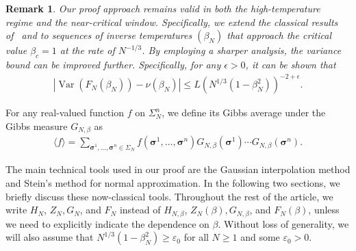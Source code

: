 \documentclass[letterpaper,11pt,reqno]{amsart}
\newtheorem{remark}{Remark}
\renewcommand{\ge}{\geqslant}
\renewcommand{\leq}{\leqslant}
\newcommand{\ra}{\rangle}
\newcommand{\la}{\langle}
\newcommand{\eps}{\varepsilon}
\newcommand{\abs}[1]{\left\vert#1\right\vert}
\newcommand{\mvgs}{\boldsymbol{\sigma}}\newcommand{\mvgS}{\boldsymbol{\Sigma}}\newcommand{\mvgt}{\boldsymbol{\tau}}
\DeclareMathOperator{\var}{Var}
\begin{document}
\begin{remark}
    Our proof approach remains valid in both the high-temperature regime and the near-critical window. Specifically, we extend the classical results of~\cite{ALR87} and \cite{CN95} to sequences of inverse temperatures $(\beta_N)$ that approach the critical value $\beta_c = 1$ at the rate of $N^{-1/3}$.
    By employing a sharper analysis, the variance bound can be improved further. Specifically, for any $\epsilon > 0$, it can be shown that
    \begin{align*} 
        \abs{\var(F_N(\beta_N)) - \nu(\beta_N)} \leq L \left( N^{1/3}(1-\beta_N^2) \right)^{-2 + \epsilon}.
    \end{align*}
\end{remark}

For any real-valued function \(f\) on \(\Sigma_N^n\), we define its Gibbs average under the Gibbs measure \(G_{N,\beta}\) as
\begin{align*}
\la f \ra = \sum_{\mvgs^1, \ldots, \mvgs^n \in \Sigma_N} f(\mvgs^1, \ldots, \mvgs^n) G_{N,\beta}(\mvgs^1) \cdots G_{N,\beta}(\mvgs^n).
\end{align*}


The main technical tools used in our proof are the Gaussian interpolation method and Stein's method for normal approximation.  
In the following two sections, we briefly discuss these now-classical tools. Throughout the rest of the article, we write $H_N$, $Z_N, G_{N}$, and $F_N$ instead of $H_{N,\beta}$, $Z_N(\beta), G_{N,\beta}$, and $F_N(\beta)$, unless we need to explicitly indicate the dependence on $\beta$.  Without loss of generality, we will also assume that $N^{1/3}(1-\beta_N^2)\ge \eps_{0}$ for all $N\ge 1$ and some $\eps_{0}>0$.
\end{document}
